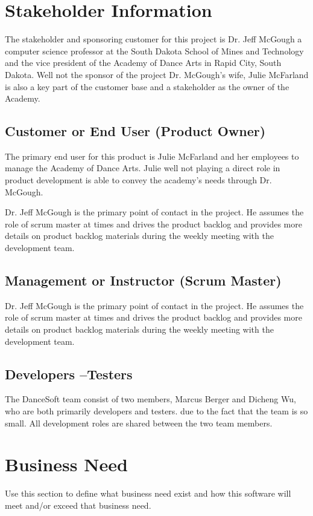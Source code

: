 \section{ Stakeholder Information}

The stakeholder and sponsoring customer for this project is Dr. Jeff McGough a computer science professor at the South Dakota School of Mines and Technology and the vice president of the Academy of Dance Arts in Rapid City, South Dakota.
Well not the sponsor of the project Dr. McGough's wife, Julie McFarland is also a key part of the customer base and a stakeholder as the owner of the Academy. 


\subsection{Customer or End User (Product Owner)}
The primary end user for this product is Julie McFarland and her employees to manage the Academy of Dance Arts. Julie well not playing a direct role in product development is able to convey the academy's needs through Dr. McGough.

Dr. Jeff McGough is the primary point of contact in the project. He assumes the role of scrum master at times and drives the product backlog and provides more details on product backlog materials during the weekly meeting with the development team. 

\subsection{Management or Instructor (Scrum Master)}
Dr. Jeff McGough is the primary point of contact in the project. He assumes the role of scrum master at times and drives the product backlog and provides more details on product backlog materials during the weekly meeting with the development team.


\subsection{Developers --Testers}
The DanceSoft team consist of two members, Marcus Berger and Dicheng Wu, who are both primarily developers and testers. due to the fact that the team is so small. All development roles are shared between the two team members.


\section{Business Need}
Use this section to define what business need exist and how this software will 
meet and/or exceed that business need.   

